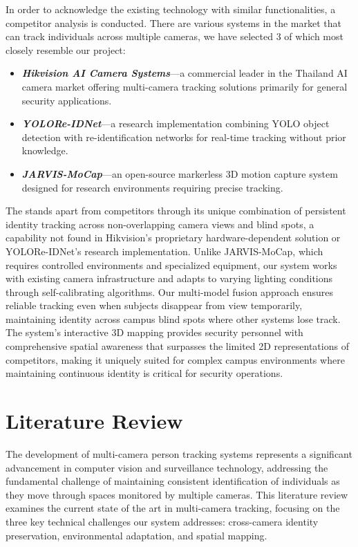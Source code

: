 In order to acknowledge the existing technology with similar functionalities, a competitor analysis is conducted.
There are various systems in the market that can track individuals across multiple cameras, we have selected 3 of which most closely resemble our project:

\begin{itemize}
    \item \textbf{\textit{Hikvision AI Camera Systems}}---a commercial leader in the Thailand AI camera market offering multi-camera tracking solutions primarily for general security applications.
    \item \textbf{\textit{YOLORe-IDNet}}---a research implementation combining YOLO object detection with re-identification networks for real-time tracking without prior knowledge.
    \item \textbf{\textit{JARVIS-MoCap}}---an open-source markerless 3D motion capture system designed for research environments requiring precise tracking.
\end{itemize}
\par
The \usevar{\srsTitle} stands apart from competitors through its unique combination of persistent identity tracking across non-overlapping camera views and blind spots, a capability not found in Hikvision's proprietary hardware-dependent solution or YOLORe-IDNet's research implementation. Unlike JARVIS-MoCap, which requires controlled environments and specialized equipment, our system works with existing camera infrastructure and adapts to varying lighting conditions through self-calibrating algorithms. Our multi-model fusion approach ensures reliable tracking even when subjects disappear from view temporarily, maintaining identity across campus blind spots where other systems lose track. The system's interactive 3D mapping provides security personnel with comprehensive spatial awareness that surpasses the limited 2D representations of competitors, making it uniquely suited for complex campus environments where maintaining continuous identity is critical for security operations.

\section{Literature Review}
\label{section:literature-review}

The development of multi-camera person tracking systems represents a significant advancement in computer vision and surveillance technology, addressing the fundamental challenge of maintaining consistent identification of individuals as they move through spaces monitored by multiple cameras. This literature review examines the current state of the art in multi-camera tracking, focusing on the three key technical challenges our system addresses: cross-camera identity preservation, environmental adaptation, and spatial mapping.

